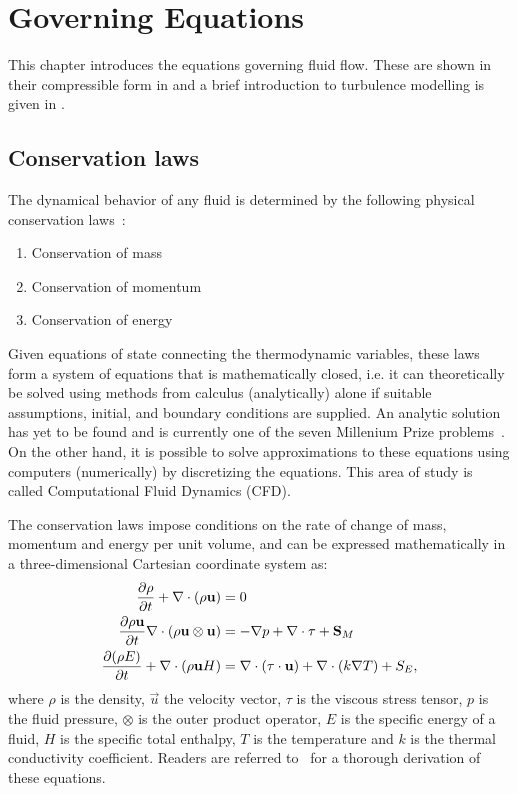 \chapter{Governing Equations}
\label{chap:governing}
This chapter introduces the  equations governing fluid flow.
These are shown in their compressible form in  and
a brief introduction to turbulence modelling is given in .
\section{Conservation laws}
\label{sec:ns}
The dynamical behavior of any fluid is determined by the following physical conservation laws~\cite{blazek2015computational}:
\begin{enumerate}
    \item Conservation of mass
    \item Conservation of momentum
    \item Conservation of energy
\end{enumerate}
Given equations of state connecting the thermodynamic variables, these laws form a system of equations that is mathematically closed, i.e. it can theoretically be solved using methods from calculus (analytically) alone if suitable assumptions, initial, and boundary conditions are supplied. An analytic solution has yet to be found and is currently one of the seven Millenium Prize problems~\cite{carlson2006millennium}. On the other hand, it is possible to solve approximations to these equations using computers (numerically) by discretizing the equations. This area of study is called Computational Fluid Dynamics (CFD).

The conservation laws impose conditions on the rate of change of mass, momentum and energy per unit volume, and can be expressed mathematically in a three-dimensional Cartesian coordinate system as:
\begin{align}
     \frac{\partial \rho}{\partial t}  + \nabla \cdot
        (\rho\mathbf{u}) &= 0 \label{eq:mass}
    \\
     \frac{\partial \rho\mathbf{u}}{\partial t}  \nabla\cdot(\rho\mathbf{u}\otimes\mathbf{u}) &= -\nabla p
     + \nabla \cdot \tau
     + \mathbf{S}_{M}
     \label{eq:mom}
     \\
     \frac{\partial (\rho E)}{\partial t}  + \nabla\cdot(\rho\mathbf{u}H) &=
      \nabla\cdot(\tau\cdot\mathbf{u}) + \nabla\cdot(k\nabla T)
         + S_E
     \label{eq:energy},
\end{align}
where $\rho$ is the density, $\vec{u}$ the velocity vector, $\tau$ is the viscous stress tensor, $p$ is the fluid pressure, $\otimes$ is the outer product operator, $E$ is the specific energy of a fluid, $H$ is the specific total enthalpy, $T$ is the temperature and $k$ is the thermal conductivity coefficient. Readers are referred to~\cite{munson2012fundamentals} for a thorough derivation of these equations.

